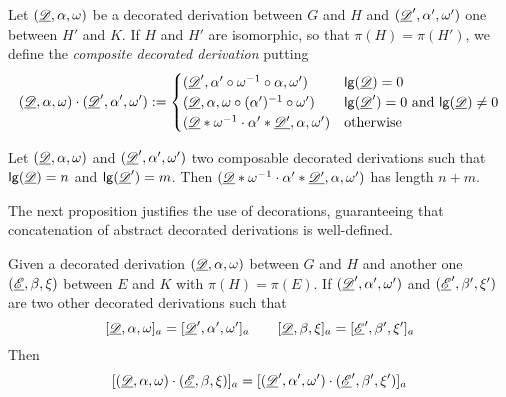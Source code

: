 \begin{definition}\label{def:conc}
Let $(\underline{\mathscr{D}}, \alpha, \omega)$ be a decorated derivation between $G$ and $H$ and $(\underline{\mathscr{D}}', \alpha', \omega')$ one between $H'$ and $K$. If $H$ and $H'$ are isomorphic, so that $\pi(H)=\pi(H')$, we define the  \emph{composite decorated derivation} putting
\[(\underline{\mathscr{D}}, \alpha, \omega)\cdot (\underline{\mathscr{D}}', \alpha', \omega'):=\begin{cases}
(\underline{\mathscr{D}}', \alpha'\circ \omega^{-1}\circ \alpha, \omega')	&\mathsf{lg}(\underline{\mathscr{D}})=0 \\
	(\underline{\mathscr{D}}, \alpha, \omega \circ (\alpha')^{-1}\circ \omega')&\mathsf{lg}(\underline{\mathscr{D}}')=0 \text{ and } \mathsf{lg}(\underline{\mathscr{D}})\neq 0\\
(\underline{\mathscr{D}}*\omega^{-1}\cdot \alpha'*\underline{\mathscr{D'}}, \alpha, \omega')	&\text{otherwise}
\end{cases}\]
\end{definition}


\begin{remark}\label{rem:lgt}
	Let $(\underline{\mathscr{D}}, \alpha, \omega)$ and $(\underline{\mathscr{D}}', \alpha', \omega')$ two composable decorated derivations   such that $\mathsf{lg}(\underline{\mathscr{D}})=n$ and $\mathsf{lg}(\underline{\mathscr{D}}')=m$.	 Then $(\underline{\mathscr{D}}*\omega^{-1}\cdot \alpha'*\underline{\mathscr{D'}}, \alpha, \omega')$ has length $n+m$.
\end{remark}

The next proposition justifies the use of decorations, guaranteeing that concatenation of abstract decorated derivations is well-defined.
\begin{lemma}\label{lem:conc}
	Given a decorated derivation $(\underline{\mathscr{D}}, \alpha, \omega)$  between $G$ and $H$ and  another one $(\underline{\mathscr{E}}, \beta, \xi)$ between $E$ and $K$ with $\pi(H)=\pi(E)$. If  $(\underline{\mathscr{D}}', \alpha', \omega')$ and $(\underline{\mathscr{E}}', \beta', \xi')$ are two other decorated derivations such that
	\[[\underline{\mathscr{D}}, \alpha, \omega]_a = [\underline{\mathscr{D}}', \alpha', \omega']_a \qquad [\underline{\mathscr{D}}, \beta, \xi]_a=[\underline{\mathscr{E}}', \beta', \xi']_a\]
	Then
	\[[(\underline{\mathscr{D}}, \alpha, \omega)\cdot (\underline{\mathscr{E}}, \beta, \xi)]_a=[(\underline{\mathscr{D}}', \alpha', \omega')\cdot (\underline{\mathscr{E}}', \beta', \xi')]_a\]
\end{lemma}

